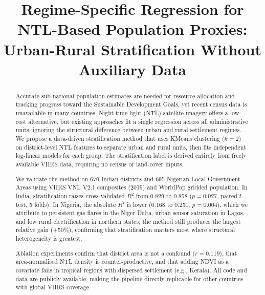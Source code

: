 \documentclass[conference]{IEEEtran}
\begin{document}
\title{Regime-Specific Regression for NTL-Based Population Proxies: Urban-Rural Stratification Without Auxiliary Data}

\author{
\and
{}
}

\maketitle

\begin{abstract}
Accurate sub-national population estimates are needed for resource allocation and tracking progress toward the Sustainable Development Goals, yet recent census data is unavailable in many countries. Night-time light (NTL) satellite imagery offers a low-cost alternative, but existing approaches fit a single regression across all administrative units, ignoring the structural difference between urban and rural settlement regimes. We propose a data-driven stratification method that uses KMeans clustering ($k{=}2$) on district-level NTL features to separate urban and rural units, then fits independent log-linear models for each group. The stratification label is derived entirely from freely available VIIRS data, requiring no census or land-cover inputs.

We validate the method on 670 Indian districts and 695 Nigerian Local Government Areas using VIIRS VNL V2.1 composites (2019) and WorldPop gridded population. In India, stratification raises cross-validated $R^2$ from 0.829 to 0.858 ($p{=}0.027$, paired $t$-test, 5 folds). In Nigeria, the absolute $R^2$ is lower (0.168 to 0.251, $p{=}0.004$), which we attribute to persistent gas flares in the Niger Delta, urban sensor saturation in Lagos, and low rural electrification in northern states; the method still produces the largest relative gain (+50\%), confirming that stratification matters most where structural heterogeneity is greatest.

Ablation experiments confirm that district area is not a confound ($r{=}0.119$), that area-normalised NTL density is counter-productive, and that adding NDVI as a covariate fails in tropical regions with dispersed settlement (e.g., Kerala). All code and data are publicly available, making the pipeline directly replicable for other countries with global VIIRS coverage.
\end{abstract}
\end{document}
